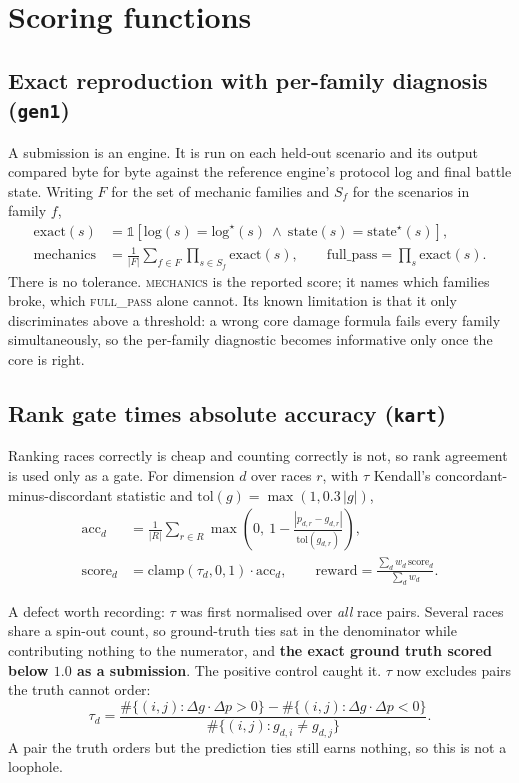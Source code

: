 \documentclass[11pt,a4paper]{article}
\newcommand{\task}[1]{\texttt{#1}}
\begin{document}
\section{Scoring functions}

\subsection{Exact reproduction with per-family diagnosis (\task{gen1})}

A submission is an engine. It is run on each held-out scenario and its output
compared byte for byte against the reference engine's protocol log and final battle
state. Writing $F$ for the set of mechanic families and $S_f$ for the scenarios in
family $f$,
\begin{align}
\mathrm{exact}(s) &= \mathbb{1}\!\left[\text{log}(s) = \text{log}^{\star}(s)\ \wedge\ \text{state}(s) = \text{state}^{\star}(s)\right], \\
\mathrm{mechanics} &= \frac{1}{|F|}\sum_{f \in F} \prod_{s \in S_f} \mathrm{exact}(s),
\qquad
\mathrm{full\_pass} = \prod_{s} \mathrm{exact}(s).
\end{align}
There is no tolerance. \textsc{mechanics} is the reported score; it names which
families broke, which \textsc{full\_pass} alone cannot. Its known limitation is that
it only discriminates above a threshold: a wrong core damage formula fails every
family simultaneously, so the per-family diagnostic becomes informative only once
the core is right.

\subsection{Rank gate times absolute accuracy (\task{kart})}

Ranking races correctly is cheap and counting correctly is not, so rank agreement is
used only as a gate. For dimension $d$ over races $r$, with $\tau$ Kendall's
concordant-minus-discordant statistic and $\mathrm{tol}(g) = \max(1, 0.3\,|g|)$,
\begin{align}
\mathrm{acc}_d &= \frac{1}{|R|}\sum_{r \in R} \max\!\left(0,\ 1 - \frac{|p_{d,r} - g_{d,r}|}{\mathrm{tol}(g_{d,r})}\right), \\
\mathrm{score}_d &= \mathrm{clamp}(\tau_d, 0, 1)\cdot \mathrm{acc}_d,
\qquad
\mathrm{reward} = \frac{\sum_d w_d\,\mathrm{score}_d}{\sum_d w_d}.
\end{align}

A defect worth recording: $\tau$ was first normalised over \emph{all} race pairs.
Several races share a spin-out count, so ground-truth ties sat in the denominator
while contributing nothing to the numerator, and \textbf{the exact ground truth
scored below $1.0$ as a submission}. The positive control caught it. $\tau$ now
excludes pairs the truth cannot order:
\begin{equation}
\tau_d = \frac{\#\{(i,j) : \Delta g \cdot \Delta p > 0\} - \#\{(i,j) : \Delta g \cdot \Delta p < 0\}}
              {\#\{(i,j) : g_{d,i} \neq g_{d,j}\}}.
\end{equation}
A pair the truth orders but the prediction ties still earns nothing, so this is not
a loophole.
\end{document}
